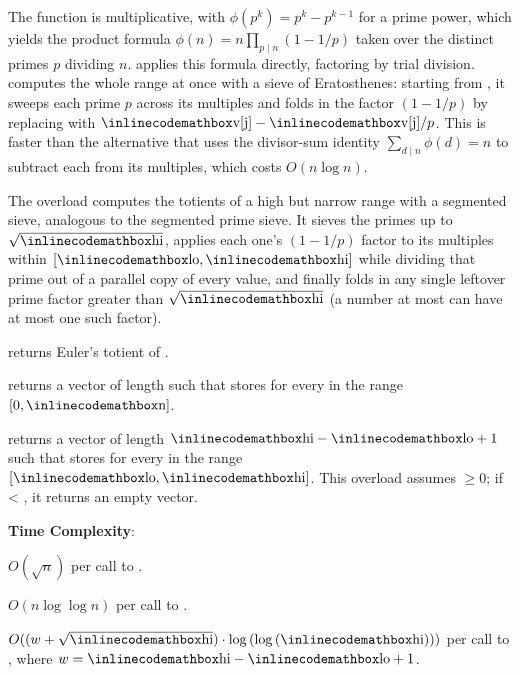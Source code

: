 The function is multiplicative, with $\phi(p^k) = p^k - p^{k-1}$ for a prime power, which yields the product formula $\phi(n) = n \prod_{p \mid n} (1 - 1/p)$ taken over the distinct primes $p$ dividing $n$.  applies this formula directly, factoring  by trial division.  computes the whole range at once with a sieve of Eratosthenes: starting from , it sweeps each prime $p$ across its multiples  and folds in the factor $(1 - 1/p)$ by replacing  with ${\inlinecodemath{v[j]}} - {\inlinecodemath{v[j]}} / p$. This is faster than the alternative that uses the divisor-sum identity $\sum_{d \mid n} \phi(d) = n$ to subtract each  from its multiples, which costs $O(n \log n)$.

The overload  computes the totients of a high but narrow range with a segmented sieve, analogous to the segmented prime sieve. It sieves the primes up to $\sqrt{{\inlinecodemath{hi}}}$, applies each one's $(1 - 1/p)$ factor to its multiples within $[{\inlinecodemath{lo}}, {\inlinecodemath{hi}}]$ while dividing that prime out of a parallel copy of every value, and finally folds in any single leftover prime factor greater than $\sqrt{{\inlinecodemath{hi}}}$ (a number at most  can have at most one such factor).

\begin{compactitem}
  \item {} returns Euler's totient of .
  \item {} returns a vector  of length  such that  stores  for every  in the range $[0, {\inlinecodemath{n}}]$.
  \item {} returns a vector  of length ${\inlinecodemath{hi}} - {\inlinecodemath{lo}} + 1$ such that  stores  for every  in the range $[{\inlinecodemath{lo}}, {\inlinecodemath{hi}}]$. This overload assumes  $\geq 0$; if  \textless{} , it returns an empty vector.
\end{compactitem}

\textbf{Time Complexity}:
\begin{compactitem}
  \item $O(\sqrt{n})$ per call to .
  \item $O(n \log \log n)$ per call to .
  \item $O((w + \sqrt{{\inlinecodemath{hi}}}) \cdot \log\left(\log\left({\inlinecodemath{hi}}\right)\right))$ per call to , where $w = {\inlinecodemath{hi}} - {\inlinecodemath{lo}} + 1$.
\end{compactitem}

